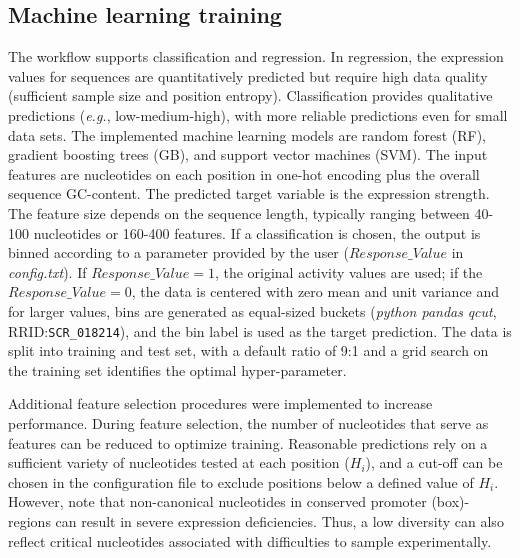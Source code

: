 \documentclass[utf8]{frontiersSCNS} %
\begin{document}
\subsection{Machine learning training} 
The workflow supports classification and regression. In regression, the expression values for sequences are quantitatively predicted but require high data quality (sufficient sample size and position entropy). Classification provides qualitative predictions (\textit{e.g.}, low-medium-high), with more reliable predictions even for small data sets. The implemented machine learning models are random forest (RF), gradient boosting trees (GB), and support vector machines (SVM). The input features are nucleotides on each position in one-hot encoding plus the overall sequence GC-content. The predicted target variable is the expression strength. The feature size depends on the sequence length, typically ranging between 40-100 nucleotides or 160-400 features. If a classification is chosen, the output is binned according to a parameter provided by the user ($Response\_Value$ in \textit{config.txt}). If $Response\_Value=1$, the original activity values are used; if the $Response\_Value=0$, the data is centered with zero mean and unit variance and for larger values, bins are generated as equal-sized buckets (\textit{python pandas} \textit{qcut}, RRID:\verb:SCR_018214:), and the bin label is used as the target prediction. The data is split into training and test set, with a default ratio of 9:1 and a grid search on the training set identifies the optimal hyper-parameter.

Additional feature selection procedures were implemented to increase performance. During feature selection, the number of nucleotides that serve as features can be reduced to optimize training. Reasonable predictions rely on a sufficient variety of nucleotides tested at each position ($H_i$), and a cut-off can be chosen in the configuration file to exclude positions below a defined value of $H_i$. However, note that non-canonical nucleotides in conserved promoter (box)-regions can result in severe expression deficiencies. Thus, a low diversity can also reflect critical nucleotides associated with difficulties to sample experimentally.   
\end{document}
